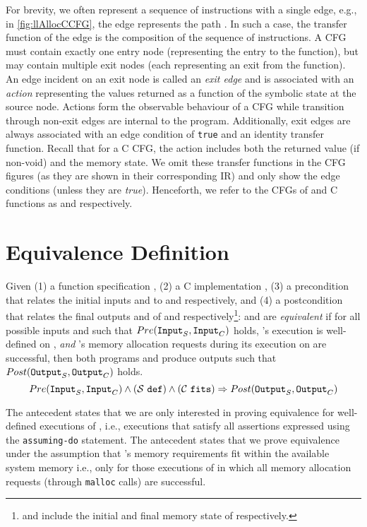 For brevity, we often represent a sequence of instructions with a single edge, e.g.,
in \cref{fig:llAllocCCFG}, the edge  represents the path .
In such a case, the transfer function of the edge is the composition of the sequence of instructions.
A CFG must contain exactly one entry node (representing the entry to the function), but may contain
multiple exit nodes (each representing an exit from the function).
An edge incident on an exit node is called an {\em exit edge} and is associated with an {\em action} representing
the values returned as a function of the symbolic state at the source node.
Actions form the observable behaviour of a CFG while transition through non-exit edges are internal to the program.
Additionally, exit edges are always associated with an edge condition of {\tt true} and an identity transfer function.
Recall that for a C CFG, the action includes both the returned value (if non-void) and the memory state.
We omit these transfer functions in the CFG figures (as they are shown in their corresponding IR)
and only show the edge conditions (unless they are {\em true}).
Henceforth, we refer to the CFGs of \SpecL{} and C functions as \sprog{} and \cprog{} respectively.

\section{Equivalence Definition}
\label{sec:eqdef}
Given (1) a \SpecL{} function specification \sprog{}, (2) a C implementation \cprog{},
(3) a precondition \pre{} that relates the initial inputs  and  to
\sprog{} and \cprog{} respectively, and (4) a postcondition \post{} that relates the final outputs
 and  of \sprog{} and \cprog{} respectively\footnote{ and 
include the initial and final memory state of \cprog{} respectively.}:
\sprog{} and \cprog{} are {\em equivalent} if for all possible inputs  and  such that
${Pre}{}({\tt Input}_{S},{\tt Input}_{C})$ holds,
\sprog{}'s execution is well-defined on , {\em and}
\cprog{}'s memory allocation requests during its execution on  are successful,
then both programs \sprog{} and \cprog{} produce outputs such that ${Post}{}({\tt Output}_{S},{\tt Output}_{C})$ holds.
$$
{Pre}{}({\tt Input}_{S},{\tt Input}_{C}) \land {({\ensuremath{\mathcal{S}}}{}\ {\tt def})}{} \land {({\ensuremath{\mathcal{C}}}{}\ {\tt fits})}{} \Rightarrow {\ensuremath{Post}}{}({\tt Output}_{S},{\tt Output}_{C})
$$

The \sdef{} antecedent states that we are only interested in proving equivalence for
well-defined executions of \sprog{}, i.e., executions that satisfy all assertions expressed
using the {\tt assuming-do} statement.
The \cfits{} antecedent states that we prove equivalence under the assumption that \cprog{}'s memory
requirements fit within the available system memory i.e., only for those executions of \cprog{}
in which all memory allocation requests (through {\tt malloc} calls) are successful.

